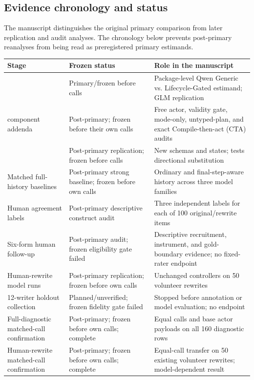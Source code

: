 \documentclass[10pt]{article}
\begin{document}
\subsection{Evidence chronology and status}
The manuscript distinguishes the original primary comparison from later replication and audit
analyses. The chronology below prevents post-primary reanalyses from being read as preregistered
primary estimands.

\begin{table}[H]
\centering
\small
\begin{tabular}{p{}p{}p{}}
\toprule
Stage & Frozen status & Role in the manuscript \\
\midrule
\PrimaryDiagnostic{} & Primary/frozen before calls & Package-level Qwen Generic vs. Lifecycle-Gated estimand; GLM replication \\
\PrimaryDiagnostic{} component addenda & Post-primary; frozen before their own calls & Free actor, validity gate, mode-only, untyped-plan, and exact Compile-then-act (CTA) audits \\
\NewSchemaReplication{} & Post-primary replication; frozen before calls & New schemas and states; tests directional substitution \\
Matched full-history baselines & Post-primary strong baseline; frozen before own calls & Ordinary and final-step-aware history across three model families \\
Human agreement labels & Post-primary descriptive construct audit & Three independent labels for each of 100 original/rewrite items \\
Six-form human follow-up & Post-primary audit; frozen eligibility gate failed & Descriptive recruitment, instrument, and gold-boundary evidence; no fixed-rater endpoint \\
Human-rewrite model runs & Post-primary replication; frozen before own calls & Unchanged controllers on 50 volunteer rewrites \\
12-writer holdout collection & Planned/unverified; frozen fidelity gate failed & Stopped before annotation or model evaluation; no endpoint \\
Full-diagnostic matched-call confirmation & Post-primary; frozen before own calls; complete & Equal calls and base actor payloads on all 160 diagnostic rows \\
Human-rewrite matched-call confirmation & Post-primary; frozen before own calls; complete & Equal-call transfer on 50 existing volunteer rewrites; model-dependent result \\

\end{tabular}
\end{table}
\end{document}
